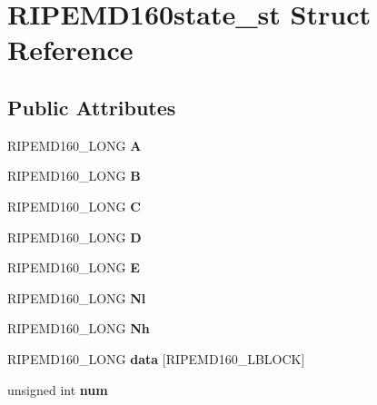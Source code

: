 \hypertarget{struct_r_i_p_e_m_d160state__st}{}\section{R\+I\+P\+E\+M\+D160state\+\_\+st Struct Reference}
\label{struct_r_i_p_e_m_d160state__st}
\subsection*{Public Attributes}
\begin{DoxyCompactItemize}
\item 
\mbox{\label{struct_r_i_p_e_m_d160state__st_aff584a2fea5f0d7e0e6417ad82b2105b}} 
R\+I\+P\+E\+M\+D160\+\_\+\+L\+O\+NG {\bfseries A}
\item 
\mbox{\label{struct_r_i_p_e_m_d160state__st_a13a7eae93311ddac26f72cdc497890c0}} 
R\+I\+P\+E\+M\+D160\+\_\+\+L\+O\+NG {\bfseries B}
\item 
\mbox{\label{struct_r_i_p_e_m_d160state__st_ab2caeef80f014ab050d680953719d66d}} 
R\+I\+P\+E\+M\+D160\+\_\+\+L\+O\+NG {\bfseries C}
\item 
\mbox{\label{struct_r_i_p_e_m_d160state__st_afe0e351485e4bd84951f447449743567}} 
R\+I\+P\+E\+M\+D160\+\_\+\+L\+O\+NG {\bfseries D}
\item 
\mbox{\label{struct_r_i_p_e_m_d160state__st_a236f279b953d3527e5d7466554a7b807}} 
R\+I\+P\+E\+M\+D160\+\_\+\+L\+O\+NG {\bfseries E}
\item 
\mbox{\label{struct_r_i_p_e_m_d160state__st_a9acc9c92383f29553b952e9eef1f637e}} 
R\+I\+P\+E\+M\+D160\+\_\+\+L\+O\+NG {\bfseries Nl}
\item 
\mbox{\label{struct_r_i_p_e_m_d160state__st_ab2372dbb5687eeda765406bac59fab6b}} 
R\+I\+P\+E\+M\+D160\+\_\+\+L\+O\+NG {\bfseries Nh}
\item 
\mbox{\label{struct_r_i_p_e_m_d160state__st_a3277ac96488c067ecd4be06bcc254acc}} 
R\+I\+P\+E\+M\+D160\+\_\+\+L\+O\+NG {\bfseries data} \mbox{[}R\+I\+P\+E\+M\+D160\+\_\+\+L\+B\+L\+O\+CK\mbox{]}
\item 
\mbox{\label{struct_r_i_p_e_m_d160state__st_acb6e5ff004459b4b8bada376dbc87014}} 
unsigned int {\bfseries num}
\end{DoxyCompactItemize}


